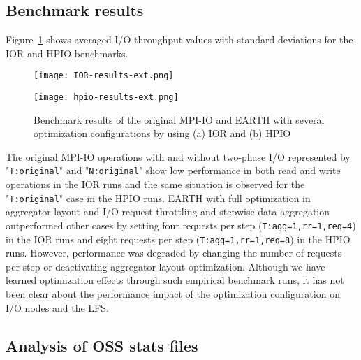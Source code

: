 \documentclass{jhps}
\begin{document}
\subsection{Benchmark results}

Figure~\ref{fig:IOR_HPIO_PERF} shows averaged I/O throughput values
with standard deviations for the IOR and HPIO benchmarks. 
%
\begin{figure}[htb]
\centering
\begin{minipage}[t]{0.46\textwidth}
 \centering
 \texttt{[image: IOR-results-ext.png]}
 \label{fig:IOR_PERF}
\end{minipage}
%
\noindent
\begin{minipage}[t]{0.46\textwidth}
 \texttt{[image: hpio-results-ext.png]}
 \label{fig:HPIO_PERF}
\end{minipage}
\caption{
Benchmark results of the original MPI-IO and EARTH with several optimization
configurations by using (a) IOR and (b) HPIO}
\label{fig:IOR_HPIO_PERF}
\end{figure}
%

The original MPI-IO operations with and without two-phase I/O represented by
"{\tt T:original}" and "{\tt N:original}" show low performance in both read and write
operations in the IOR runs and the same situation is observed
for the "{\tt T:original}" case in the HPIO runs.
EARTH with full optimization in aggregator layout and I/O request throttling
and stepwise data aggregation outperformed other cases by setting four requests per step
({\tt T:agg=1,rr=1,req=4}) in the IOR runs and eight requests per step
({\tt T:agg=1,rr=1,req=8}) in the HPIO runs.
However, performance was degraded by changing the number of requests per step
or deactivating aggregator layout optimization.
Although we have learned optimization effects through such empirical benchmark runs,
it has not been clear about the performance impact of the optimization configuration
on I/O nodes and the LFS.

\subsection{Analysis of OSS stats files}
\end{document}
